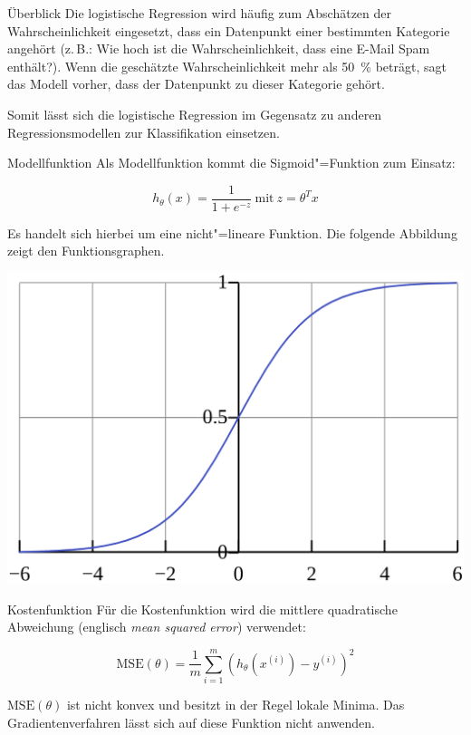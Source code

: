 \documentclass[a4paper, 10pt, twocolumn]{scrartcl}
\newcommand{\spacer}{\vfill}
\begin{document}
\begin{block}{Überblick}
Die logistische Regression wird häufig zum Abschätzen der Wahrscheinlichkeit eingesetzt, dass ein Datenpunkt einer bestimmten Kategorie angehört (z.\,B.: Wie hoch ist die Wahrscheinlichkeit, dass eine E-Mail Spam enthält?). Wenn die geschätzte Wahrscheinlichkeit mehr als 50~\% beträgt, sagt das Modell vorher, dass der Datenpunkt zu dieser Kategorie gehört.

Somit lässt sich die logistische Regression im Gegensatz zu anderen Regressionsmodellen zur Klassifikation einsetzen.
\end{block}

\spacer

\begin{block}{Modellfunktion}
Als Modellfunktion kommt die Sigmoid"=Funktion zum Einsatz:

\begin{equation*}
h_{\theta}(x) = \frac{1}{1 + e^{-z}} \mathrm{~mit~} z = \theta^{T}x
\end{equation*}

Es handelt sich hierbei um eine nicht"=lineare Funktion. Die folgende Abbildung zeigt den Funktionsgraphen.

\begin{center}
\includegraphics[width=0.5\linewidth]{logistisch_funkt}
\end{center}
\end{block}

\spacer

\begin{block}{Kostenfunktion}
Für die Kostenfunktion wird die mittlere quadratische Abweichung (englisch \emph{mean squared error}) verwendet:

\begin{equation*}
\mathrm{MSE}(\theta) = \frac{1}{m} \sum_{i=1}^{m}(h_{\theta}(x^{(i)}) - y^{(i)})^{2} 
\end{equation*}

$\mathrm{MSE}(\theta)$ ist nicht konvex und besitzt in der Regel lokale Minima. Das Gradientenverfahren lässt sich auf diese Funktion nicht anwenden.
\end{block}
\end{document}
